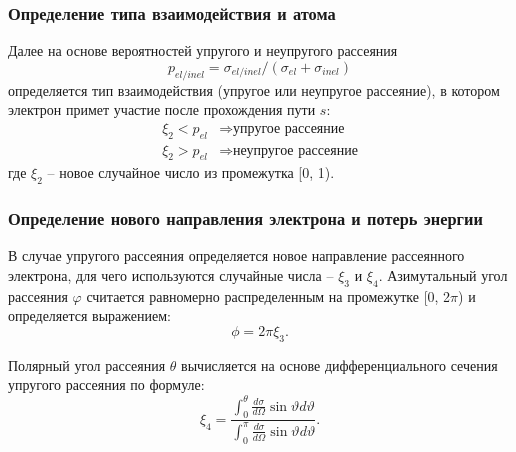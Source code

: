 \subsubsection{Определение типа взаимодействия и атома}
Далее на основе вероятностей упругого и неупругого рассеяния
\begin{equation} \label{eq:MC_8}
	p_{el/inel}=\sigma_{el/inel} /\left(\sigma_{el}+\sigma_{inel} \right)
\end{equation}
определяется тип взаимодействия (упругое или неупругое рассеяние), в котором электрон примет участие после прохождения пути $s$:
\begin{equation} \label{eq:MC_9}
	\begin{aligned}
		\xi_2 < p_{el} & \Rightarrow \text{упругое рассеяние} \\
		\xi_2 > p_{el} & \Rightarrow \text{неупругое рассеяние}
	\end{aligned}
\end{equation}
где $\xi_2$ -- новое случайное число из промежутка [0, 1).

\subsubsection{Определение нового направления электрона и потерь энергии}
В случае упругого рассеяния определяется новое направление рассеянного электрона, для чего используются случайные числа -- $\xi_3$ и $\xi_4$. Азимутальный угол рассеяния $\varphi$ считается равномерно распределенным на промежутке [0, 2$\pi$) и определяется выражением:
\begin{equation} \label{eq:MC_11}
	\phi = 2 \pi \xi_3.
\end{equation}

Полярный угол рассеяния $\theta$ вычисляется на основе дифференциального сечения упругого рассеяния по формуле:
\begin{equation} \label{eq:MC_12}
	\xi_4 = \frac
	{\displaystyle \int_0^\theta \frac{d \sigma}{d \Omega} \sin \vartheta d \vartheta}
	{\displaystyle \int_0^\pi \frac{d \sigma}{d \Omega} \sin \vartheta d \vartheta}.
\end{equation}

